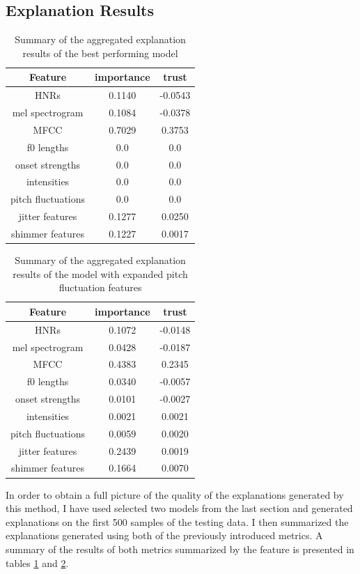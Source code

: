 \documentclass{article}
\begin{document}
		\subsection{Explanation Results}
		\begin{table}[htbp]
			\centering
			\begin{tabular}{c | c | c}
				Feature & importance & trust \\
				\hline
				HNRs & 0.1140 & -0.0543 \\
				mel spectrogram & 0.1084 & -0.0378 \\
				MFCC & 0.7029 & 0.3753 \\
				f0 lengths & 0.0 & 0.0 \\
				onset strengths & 0.0 & 0.0 \\
				intensities & 0.0 & 0.0 \\
				pitch fluctuations & 0.0 & 0.0 \\
				jitter features & 0.1277 & 0.0250 \\
				shimmer features & 0.1227 & 0.0017
			\end{tabular}
			\label{table:exp-results-cterm}
			\caption{Summary of the aggregated explanation results of the best performing model}
		\end{table}
		\begin{table}[htbp]
			\centering
			\begin{tabular}{c | c | c}
				Feature & importance & trust \\
				\hline
				HNRs & 0.1072 & -0.0148 \\
				mel spectrogram & 0.0428 & -0.0187 \\
				MFCC & 0.4383 & 0.2345 \\
				f0 lengths & 0.0340 & -0.0057 \\
				onset strengths & 0.0101 & -0.0027 \\
				intensities & 0.0021 & 0.0021 \\
				pitch fluctuations & 0.0059 & 0.0020 \\
				jitter features & 0.2439 & 0.0019 \\
				shimmer features & 0.1664 & 0.0070
			\end{tabular}
			\label{table:exp-results-more-pitch-flucs}
			\caption{Summary of the aggregated explanation results of the model with expanded
			pitch fluctuation features}
		\end{table}
		In order to obtain a full picture of the quality of the explanations generated by this
		method, I have used selected two models from the last section and generated explanations
		on the first 500 samples of the testing data. I then summarized the explanations generated
		using both of the previously introduced metrics. A summary of the results of both metrics
		summarized by the feature is presented in tables \ref{table:exp-results-cterm} and
		\ref{table:exp-results-more-pitch-flucs}. 
\end{document}
